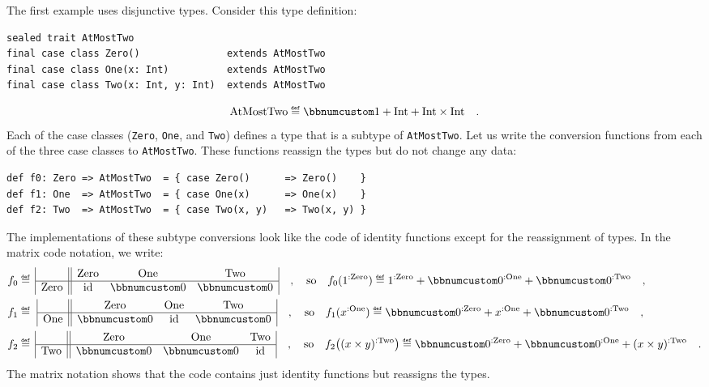 The first example uses disjunctive types. Consider this type definition:
\begin{lstlisting}
sealed trait AtMostTwo
final case class Zero()               extends AtMostTwo
final case class One(x: Int)          extends AtMostTwo
final case class Two(x: Int, y: Int)  extends AtMostTwo
\end{lstlisting}
\[
\text{AtMostTwo}\triangleq\bbnum 1+\text{Int}+\text{Int}\times\text{Int}\quad.
\]
Each of the case classes (\lstinline!Zero!, \lstinline!One!, and
\lstinline!Two!) defines a type that is a subtype of \lstinline!AtMostTwo!.
Let us write the conversion functions from each of the three case
classes to \lstinline!AtMostTwo!. These functions reassign the types
but do not change any data:
\begin{lstlisting}
def f0: Zero => AtMostTwo  = { case Zero()      => Zero()    }
def f1: One  => AtMostTwo  = { case One(x)      => One(x)    }
def f2: Two  => AtMostTwo  = { case Two(x, y)   => Two(x, y) }
\end{lstlisting}
The implementations of these subtype conversions look like the code
of identity functions except for the reassignment of types. In the
matrix code notation, we write:{\small{}
\begin{align*}
f_{0} & \triangleq\,\begin{array}{|c||ccc|}
 & \text{Zero} & \text{One} & \text{Two}\\
\hline \text{Zero} & \text{id} & \bbnum 0 & \bbnum 0
\end{array}\quad,\quad\text{so}\quad f_{0}(1^{:\text{Zero}})\triangleq1^{:\text{Zero}}+\bbnum 0^{:\text{One}}+\bbnum 0^{:\text{Two}}\quad,\\
f_{1} & \triangleq\,\,\begin{array}{|c||ccc|}
 & \text{Zero} & \text{One} & \text{Two}\\
\hline \text{One} & \bbnum 0 & \text{id} & \bbnum 0
\end{array}\quad,\quad\text{so}\quad f_{1}(x^{:\text{One}})\triangleq\bbnum 0^{:\text{Zero}}+x^{:\text{One}}+\bbnum 0^{:\text{Two}}\quad,\\
f_{2} & \triangleq\,\begin{array}{|c||ccc|}
 & \text{Zero} & \text{One} & \text{Two}\\
\hline \text{Two} & \bbnum 0 & \bbnum 0 & \text{id}
\end{array}\quad,\quad\text{so}\quad f_{2}\big((x\times y)^{:\text{Two}}\big)\triangleq\bbnum 0^{:\text{Zero}}+\bbnum 0^{:\text{One}}+(x\times y)^{:\text{Two}}\quad.
\end{align*}
}The matrix notation shows that the code contains just identity functions
but reassigns the types.

